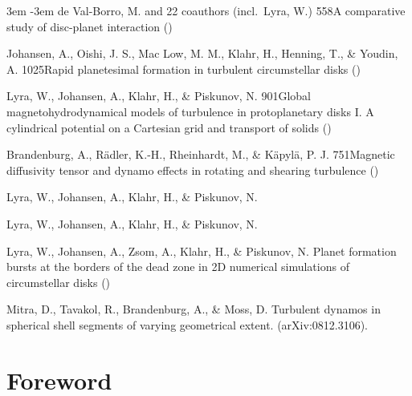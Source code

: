 \documentclass[\mydriver,12pt,twoside,notitlepage,a4paper]{article}
\begin{document}
\begin{list}{}{\leftmargin 3em \itemindent -3em\listparindent \itemindent
\itemsep 0pt \parsep 1pt}
de Val-Borro, M. and 22 coauthors (incl.\ Lyra, W.)
{558}{A comparative study of disc-planet interaction}
()

Johansen, A., Oishi, J. S., Mac Low, M. M., Klahr, H., Henning, T.,
\& Youdin, A.
{1025}{Rapid planetesimal formation in turbulent circumstellar disks}
()

Lyra, W., Johansen, A., Klahr, H., \& Piskunov, N.
{901}{Global magnetohydrodynamical models of turbulence in protoplanetary disks I. A cylindrical potential on a Cartesian grid and transport of solids}
()

Brandenburg, A., R\"adler, K.-H., Rheinhardt, M., \& K\"apyl\"a, P. J.
{751}{Magnetic diffusivity tensor and dynamo effects in rotating
and shearing turbulence}
()

Lyra, W., Johansen, A., Klahr, H., \& Piskunov, N.

Lyra, W., Johansen, A., Klahr, H., \& Piskunov, N.

Lyra, W., Johansen, A., Zsom, A., Klahr, H., \& Piskunov, N.
{Planet formation bursts at the borders of the dead zone in 2D numerical simulations of circumstellar disks}
()

Mitra, D., Tavakol, R., Brandenburg, A., \& Moss, D.
{Turbulent dynamos in spherical shell segments of varying geometrical 
extent.}
(arXiv:0812.3106). 
\end{list}

\clearpage


\section*{Foreword}
\end{document}
